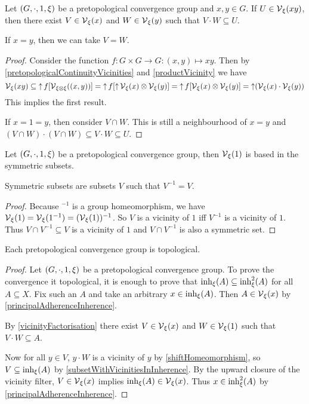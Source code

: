 \begin{lemma} \label{vicinityFactorisation}
Let $\left( G,\cdot, 1, \xi \right)$ be a pretopological convergence group and $x,y\in G$. If $U\in \operatorname{\mathcal{V}}_\xi(xy)$, then there exist $V\in \operatorname{\mathcal{V}}_\xi(x)$ and $W\in \operatorname{\mathcal{V}}_\xi(y)$ such that $V\cdot W\subseteq U$.

If $x=y$, then we can take $V = W$.
\end{lemma}
\begin{proof}
Consider the function $f: G\times G \to G: (x,y)\mapsto xy$. Then by \ref{pretopologicalContinuityVicinities} and \ref{productVicinity} we have
\[ \operatorname{\mathcal{V}}_\xi(xy) \subseteq \operatorname{\uparrow} f[\operatorname{\mathcal{V}}_{\xi\otimes\xi}((x,y))] = \operatorname{\uparrow} f[\operatorname{\uparrow} \operatorname{\mathcal{V}}_\xi(x)\otimes \operatorname{\mathcal{V}}_\xi(y)] = \operatorname{\uparrow} f[\operatorname{\mathcal{V}}_\xi(x)\otimes \operatorname{\mathcal{V}}_\xi(y)] = \operatorname{\uparrow} (\operatorname{\mathcal{V}}_\xi(x)\cdot \operatorname{\mathcal{V}}_\xi(y)) \]
This implies the first result.

If $x=1=y$, then consider $V\cap W$. This is still a neighbourhood of $x=y$ and $(V\cap W)\cdot(V\cap W) \subseteq V\cdot W \subseteq U$.
\end{proof}

\begin{lemma} \label{symmetricBase}
Let $\left( G,\cdot, 1, \xi \right)$ be a pretopological convergence group, then $\operatorname{\mathcal{V}}_\xi(1)$ is based in the symmetric subsets.
\end{lemma}
Symmetric subsets are subsets $V$ such that $V^{-1} = V$.
\begin{proof}
Because $^{-1}$ is a group homeomorphism, we have $\operatorname{\mathcal{V}}_\xi(1) = \operatorname{\mathcal{V}}_\xi(1^{-1}) = (\operatorname{\mathcal{V}}_\xi(1))^{-1}$. So $V$ is a vicinity of $1$ iff $V^{-1}$ is a vicinity of $1$. Thus $V\cap V^{-1}\subseteq V$ is a vicinity of $1$ and $V\cap V^{-1}$ is also a symmetric set.
\end{proof}

\begin{proposition} \label{pretopologicalGroupConvergence}
Each pretopological convergence group is topological.
\end{proposition}
\begin{proof}
Let $\left( G,\cdot, 1, \xi \right)$ be a pretopological convergence group. To prove the convergence it topological, it is enough to prove that $\operatorname{inh}_\xi(A) \subseteq \operatorname{inh}^2_\xi(A)$ for all $A\subseteq X$. Fix such an $A$ and take an arbitrary $x\in \operatorname{inh}_\xi(A)$. Then $A\in \operatorname{\mathcal{V}}_\xi(x)$ by \ref{principalAdherenceInherence}.

By \ref{vicinityFactorisation} there exist $V\in \operatorname{\mathcal{V}}_\xi(x)$ and $W\in\operatorname{\mathcal{V}}_\xi(1)$ such that $V\cdot W \subseteq A$.

Now for all $y\in V$, $y\cdot W$ is a vicinity of $y$ by \ref{shiftHomeomorphism}, so $V \subseteq \operatorname{inh}_\xi(A)$ by \ref{subsetWithVicinitiesInInherence}. By the upward closure of the vicinity filter, $V\in \operatorname{\mathcal{V}}_\xi(x)$ implies $\operatorname{inh}_\xi(A) \in \operatorname{\mathcal{V}}_\xi(x)$. Thus $x\in \operatorname{inh}_\xi^2(A)$ by \ref{principalAdherenceInherence}.
\end{proof}

